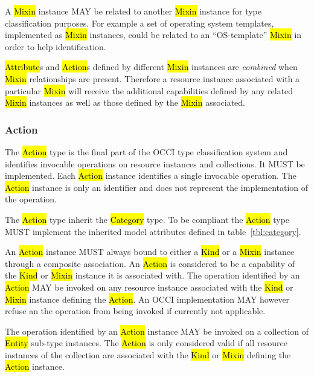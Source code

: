 \documentclass[10pt,a4paper]{article}
\begin{document}
A \hl{Mixin} instance MAY be related to another \hl{Mixin} instance
for type classification purposes. For example a set of operating
system templates, implemented as \hl{Mixin} instances, could be
related to an ``OS-template'' \hl{Mixin} in order to help
identification.

\hl{Attribute}s and \hl{Action}s defined by different \hl{Mixin} instances
are {\em combined} when \hl{Mixin} relationships are present. Therefore a
resource instance associated with a particular \hl{Mixin} will receive
the additional capabilities defined by any related \hl{Mixin}
instances as well as those defined by the \hl{Mixin} associated.


\subsubsection{Action}
The \hl{Action} type is the final part of the OCCI type classification system
and identifies invocable operations on resource instances and collections.
It MUST be implemented.
Each \hl{Action} instance identifies a single invocable operation.
The \hl{Action} instance is only an identifier and does not represent the
implementation of the operation.

The \hl{Action} type inherit the \hl{Category} type. To be compliant
the \hl{Action} type MUST implement the inherited model attributes defined in
table~\ref{tbl:category}.

An \hl{Action} instance MUST always bound to either a \hl{Kind} or a \hl{Mixin}
instance through a composite association. An \hl{Action} is considered
to be a capability of the \hl{Kind} or \hl{Mixin} instance it is
associated with.  The operation identified by an \hl{Action} MAY be invoked on
any resource
instance associated with the \hl{Kind} or \hl{Mixin} instance defining
the \hl{Action}. An OCCI implementation MAY however refuse an
the operation from being invoked if currently not applicable.

The operation identified by an \hl{Action} instance MAY be invoked on a
collection of \hl{Entity} sub-type
instances. The \hl{Action} is only considered valid if all resource
instances of the collection are associated with the \hl{Kind} or
\hl{Mixin} defining the \hl{Action} instance.

\end{document}
